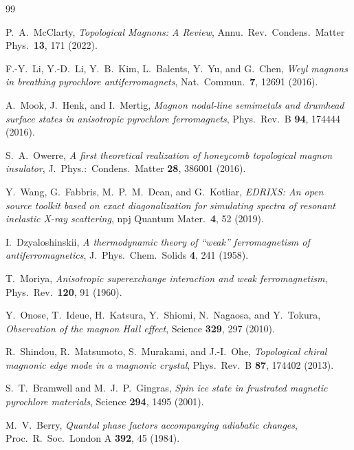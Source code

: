 \documentclass[aps,prb,twocolumn,superscriptaddress,longbibliography]{revtex4-2}
\begin{document}
\begin{thebibliography}{99}

P.~A.~McClarty,
\textit{Topological Magnons: A Review},
Annu.\ Rev.\ Condens.\ Matter Phys.\ \textbf{13}, 171 (2022).

F.-Y.~Li, Y.-D.~Li, Y.~B.~Kim, L.~Balents, Y.~Yu, and G.~Chen,
\textit{Weyl magnons in breathing pyrochlore antiferromagnets},
Nat.\ Commun.\ \textbf{7}, 12691 (2016).

A.~Mook, J.~Henk, and I.~Mertig,
\textit{Magnon nodal-line semimetals and drumhead surface states in anisotropic
pyrochlore ferromagnets},
Phys.\ Rev.\ B \textbf{94}, 174444 (2016).

S.~A.~Owerre,
\textit{A first theoretical realization of honeycomb topological magnon insulator},
J.\ Phys.:\ Condens.\ Matter \textbf{28}, 386001 (2016).

Y.~Wang, G.~Fabbris, M.~P.~M.~Dean, and G.~Kotliar,
\textit{EDRIXS: An open source toolkit based on exact diagonalization for
simulating spectra of resonant inelastic X-ray scattering},
npj Quantum Mater.\ \textbf{4}, 52 (2019).

I.~Dzyaloshinskii,
\textit{A thermodynamic theory of ``weak'' ferromagnetism of antiferromagnetics},
J.\ Phys.\ Chem.\ Solids \textbf{4}, 241 (1958).

T.~Moriya,
\textit{Anisotropic superexchange interaction and weak ferromagnetism},
Phys.\ Rev.\ \textbf{120}, 91 (1960).

Y.~Onose, T.~Ideue, H.~Katsura, Y.~Shiomi, N.~Nagaosa, and Y.~Tokura,
\textit{Observation of the magnon Hall effect},
Science \textbf{329}, 297 (2010).

R.~Shindou, R.~Matsumoto, S.~Murakami, and J.-I.~Ohe,
\textit{Topological chiral magnonic edge mode in a magnonic crystal},
Phys.\ Rev.\ B \textbf{87}, 174402 (2013).

S.~T.~Bramwell and M.~J.~P.~Gingras,
\textit{Spin ice state in frustrated magnetic pyrochlore materials},
Science \textbf{294}, 1495 (2001).

M.~V.~Berry,
\textit{Quantal phase factors accompanying adiabatic changes},
Proc.\ R.\ Soc.\ London A \textbf{392}, 45 (1984).


\end{thebibliography}
\end{document}
